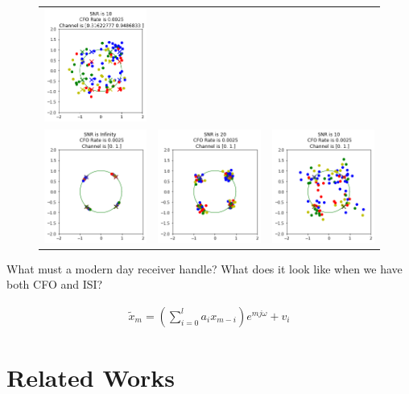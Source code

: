 \begin{figure}
\begin{tabular}{ccc}
    \includegraphics[width=45mm]{figures/cfo_equal_intro/snr_10_c4/cfo_0.png}\\
    \includegraphics[width=45mm]{figures/cfo_equal_intro/snr_0_c5/cfo_0.png}&
    \includegraphics[width=45mm]{figures/cfo_equal_intro/snr_20_c5/cfo_0.png}&
    \includegraphics[width=45mm]{figures/cfo_equal_intro/snr_10_c5/cfo_0.png}\\
  \end{tabular}
\end{figure}

What must a modern day receiver handle?  What does it look like when we have both CFO and ISI?

\begin{align}
\tilde{x}_m = (\sum_{i=0}^l a_i x_{m-i})e^{mj\omega} + v_i
\end{align}


\section{Related Works}


